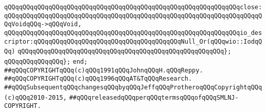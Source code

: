 \newline
\verb|qQQqqQQqqQQqqQQqqQQqqQQqqQQqqQQqqQQqqQQqqQQqqQQqqQQqqQQqqQQqqQQqclose:qQQqqQQqqQQqqQQqqQQqqQQqqQQqqQQqqQQqqQQqqQQqqQQqqQQqqQQqqQQqqQQqqQQqqQQqVoidqQQq->qQQqVoid,|\newline
\newline
\verb|qQQqqQQqqQQqqQQqqQQqqQQqqQQqqQQqqQQqqQQqqQQqqQQqqQQqqQQqqQQqqQQqio_descriptor:qQQqqQQqqQQqqQQqqQQqqQQqqQQqqQQqqQQqqQQqNull_Or(qQQqwio::IodqQQq)|\newline
\verb|qQQqqQQqqQQqqQQqqQQqqQQqqQQqqQQqqQQqqQQqqQQqqQQqqQQqqQQq};|\newline
\newline
\verb|qQQqqQQqqQQqqQQq};|\newline
\verb|end;|\newline
\newline
\newline
\verb|##qQQqCOPYRIGHTqQQq(c)qQQq1991qQQqJohnqQQqH.qQQqReppy.|\newline
\verb|##qQQqCOPYRIGHTqQQq(c)qQQq1996qQQqAT&TqQQqResearch.|\newline
\verb|##qQQqSubsequentqQQqchangesqQQqbyqQQqJeffqQQqProtheroqQQqCopyrightqQQq(c)qQQq2010-2015,|\newline
\verb|##qQQqreleasedqQQqperqQQqtermsqQQqofqQQqSMLNJ-COPYRIGHT.|\newline

